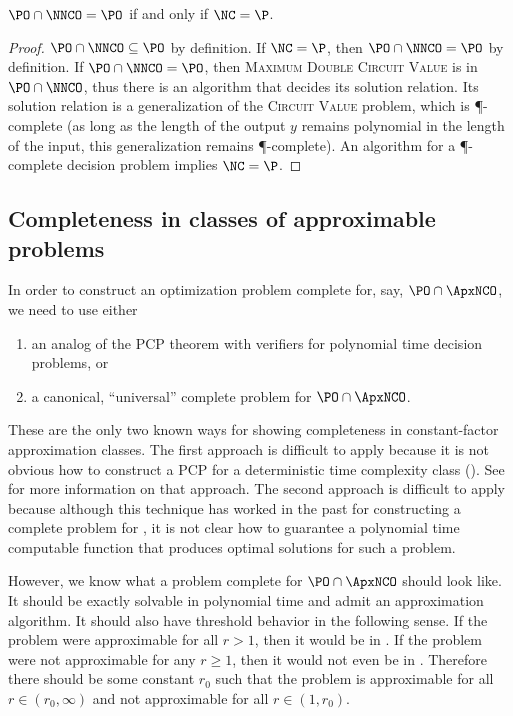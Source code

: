 \documentclass[]{article}
\begin{document}
\begin{theorem}\label{thm:poppo}
  $\PO \cap \NNCO = \PO$ if and only if $\NC = \P$.
\end{theorem}
\begin{proof}
  $\PO \cap \NNCO \subseteq \PO$ by definition.
  If $\NC = \P$, then $\PO \cap \NNCO = \PO$ by definition.
  If $\PO \cap \NNCO = \PO$, then \textsc{Maximum Double Circuit Value} is in $\PO \cap \NNCO$, thus there is an \NC{} algorithm that decides its solution relation.
  Its solution relation is a generalization of the \textsc{Circuit Value} problem, which is \P-complete (as long as the length of the output $y$ remains polynomial in the length of the input, this generalization remains \P-complete).
  An \NC{} algorithm for a \P-complete decision problem implies $\NC = \P$.
\end{proof}

\subsection{Completeness in classes of approximable problems}

In order to construct an optimization problem complete for, say, $\PO \cap \ApxNCO$, we need to use either
\begin{enumerate}
\item an analog of the PCP theorem with \NC{} verifiers for polynomial time decision problems, or
\item a canonical, ``universal'' complete problem for $\PO \cap \ApxNCO$.
\end{enumerate}
These are the only two known ways for showing completeness in constant-factor approximation classes.
The first approach is difficult to apply because it is not obvious how to construct a PCP for a deterministic time complexity class (\PO).
See \cite{finkelstein13} for more information on that approach.
The second approach is difficult to apply because although this technique has worked in the past for constructing a complete problem for \ApxPO{} \cite[Lemma~2]{cp91}, it is not clear how to guarantee a polynomial time computable function that produces optimal solutions for such a problem.

However, we know what a problem complete for $\PO \cap \ApxNCO$ should look like.
It should be exactly solvable in polynomial time and admit an \NC{} approximation algorithm.
It should also have threshold behavior in the following sense.
If the problem were approximable for all $r > 1$, then it would be in \NCAS.
If the problem were not approximable for any $r \geq 1$, then it would not even be in \ApxNCO.
Therefore there should be some constant $r_0$ such that the problem is approximable for all $r \in (r_0, \infty)$ and not approximable for all $r \in (1, r_0)$.
\end{document}
